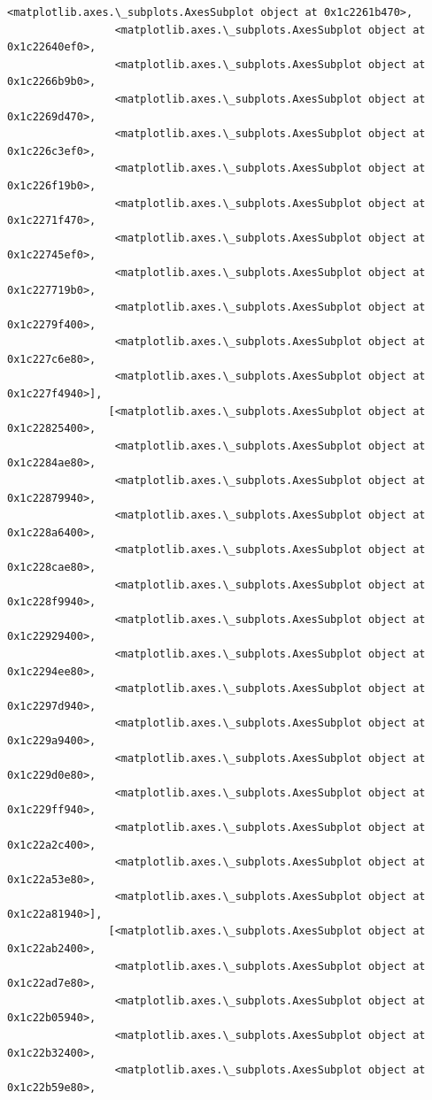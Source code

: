 \documentclass[11pt]{article}
\begin{document}
\begin{Verbatim}[commandchars=\\\{\}]
                 <matplotlib.axes.\_subplots.AxesSubplot object at 0x1c2261b470>,
                 <matplotlib.axes.\_subplots.AxesSubplot object at 0x1c22640ef0>,
                 <matplotlib.axes.\_subplots.AxesSubplot object at 0x1c2266b9b0>,
                 <matplotlib.axes.\_subplots.AxesSubplot object at 0x1c2269d470>,
                 <matplotlib.axes.\_subplots.AxesSubplot object at 0x1c226c3ef0>,
                 <matplotlib.axes.\_subplots.AxesSubplot object at 0x1c226f19b0>,
                 <matplotlib.axes.\_subplots.AxesSubplot object at 0x1c2271f470>,
                 <matplotlib.axes.\_subplots.AxesSubplot object at 0x1c22745ef0>,
                 <matplotlib.axes.\_subplots.AxesSubplot object at 0x1c227719b0>,
                 <matplotlib.axes.\_subplots.AxesSubplot object at 0x1c2279f400>,
                 <matplotlib.axes.\_subplots.AxesSubplot object at 0x1c227c6e80>,
                 <matplotlib.axes.\_subplots.AxesSubplot object at 0x1c227f4940>],
                [<matplotlib.axes.\_subplots.AxesSubplot object at 0x1c22825400>,
                 <matplotlib.axes.\_subplots.AxesSubplot object at 0x1c2284ae80>,
                 <matplotlib.axes.\_subplots.AxesSubplot object at 0x1c22879940>,
                 <matplotlib.axes.\_subplots.AxesSubplot object at 0x1c228a6400>,
                 <matplotlib.axes.\_subplots.AxesSubplot object at 0x1c228cae80>,
                 <matplotlib.axes.\_subplots.AxesSubplot object at 0x1c228f9940>,
                 <matplotlib.axes.\_subplots.AxesSubplot object at 0x1c22929400>,
                 <matplotlib.axes.\_subplots.AxesSubplot object at 0x1c2294ee80>,
                 <matplotlib.axes.\_subplots.AxesSubplot object at 0x1c2297d940>,
                 <matplotlib.axes.\_subplots.AxesSubplot object at 0x1c229a9400>,
                 <matplotlib.axes.\_subplots.AxesSubplot object at 0x1c229d0e80>,
                 <matplotlib.axes.\_subplots.AxesSubplot object at 0x1c229ff940>,
                 <matplotlib.axes.\_subplots.AxesSubplot object at 0x1c22a2c400>,
                 <matplotlib.axes.\_subplots.AxesSubplot object at 0x1c22a53e80>,
                 <matplotlib.axes.\_subplots.AxesSubplot object at 0x1c22a81940>],
                [<matplotlib.axes.\_subplots.AxesSubplot object at 0x1c22ab2400>,
                 <matplotlib.axes.\_subplots.AxesSubplot object at 0x1c22ad7e80>,
                 <matplotlib.axes.\_subplots.AxesSubplot object at 0x1c22b05940>,
                 <matplotlib.axes.\_subplots.AxesSubplot object at 0x1c22b32400>,
                 <matplotlib.axes.\_subplots.AxesSubplot object at 0x1c22b59e80>,

\end{Verbatim}
\end{document}
